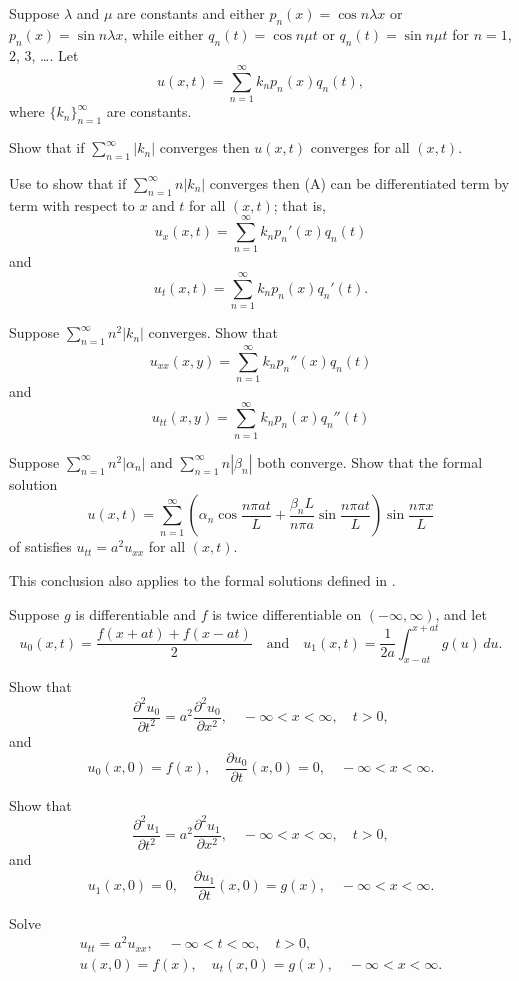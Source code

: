 \begin{exerciselist}
\item\label{exer:12.2.62}Suppose $\lambda$ and $\mu$ are constants and either $p_n(x)=
\cos n\lambda x$ or $p_n(x)=\sin n\lambda x$, while either
$q_n(t)=\cos n\mu t$ or $q_n(t)=\sin n\mu t$ for $n=1$, $2$, $3$, \dots.
Let
\[
u(x,t)=\sum_{n=1}^\infty k_np_n(x)q_n(t),
\tag{A}
\]
where $\{k_n\}_{n=1}^\infty$ are constants.
\begin{alist}
\item %
Show that if $\sum_{n=1}^\infty |k_n|$ converges
then $u(x,t)$ converges for all $(x,t)$.
\item %
Use  to
show that if $\sum_{n=1}^\infty n|k_n|$ converges then
(A) can be differentiated term by term with respect to $x$
and $t$ for all $(x,t)$; that is,
\[
u_x(x,t)=
\sum_{n=1}^\infty k_np_n'(x)q_n(t)
\]
and
\[
u_t(x,t)=
\sum_{n=1}^\infty k_np_n(x)q_n'(t).
\]
\item %
Suppose  $\sum_{n=1}^\infty n^2|k_n|$ converges. Show that
\[
u_{xx}(x,y)=
\sum_{n=1}^\infty k_np_n''(x)q_n(t)
\]
and
\[
u_{tt}(x,y)=
\sum_{n=1}^\infty k_np_n(x)q_n''(t)
\]
\item %
Suppose  $\sum_{n=1}^\infty n^2|\alpha_n|$ and
$\sum_{n=1}^\infty n|\beta_n|$ both converge.
Show that the formal solution
\[
u(x,t)=\sum_{n=1}^\infty\left(\alpha_n\cos\frac{n\pi at}{L}+\frac{\beta_nL}{n\pi a}\sin\frac{n\pi at}{L}\right)
\sin\frac{n\pi x}{L}
\]
of  satisfies
$u_{tt}=a^2u_{xx}$ for all
$(x,t)$.

This conclusion also applies to the formal solutions defined in
.
\end{alist}

\item\label{exer:12.2.63}Suppose $g$ is differentiable and $f$ is twice differentiable on
$(-\infty,\infty)$, and let
\[
u_0(x,t)=\frac{f(x+at)+f(x-at)}{2}\quad\text{and}\quad
u_1(x,t)=\frac{1}{2a}\int_{x-at}^{x+at}g(u)\,du.
\]
\begin{alist}
\item %
Show that
\[
\frac{\partial^2 u_0}{\partial t^2}=a^2\frac{\partial^2u_0}{\partial
x^2},\quad-\infty<x<\infty,\quad t>0,
\]
and
\[
u_0(x,0)=f(x),\quad  \frac{\partial u_0}{\partial t}(x,0)=0,\quad
-\infty<x<\infty.
\]
\item %
Show that
\[
\frac{\partial^2 u_1}{\partial t^2}=a^2\frac{\partial^2u_1}{\partial
x^2},\quad-\infty<x<\infty,\quad t>0,
\]
and
\[
u_1(x,0)=0,\quad  \frac{\partial u_1}{\partial t}(x,0)=g(x),\quad
-\infty<x<\infty.
\]
\item %
Solve
\begin{gather*}
u_{tt}=a^2u_{xx},\quad-\infty<t<\infty,\quad t>0,\\
u(x,0)=f(x),\quad u_t(x,0)=g(x),\quad-\infty<x<\infty.
\end{gather*}
\end{alist}


\end{exerciselist}
